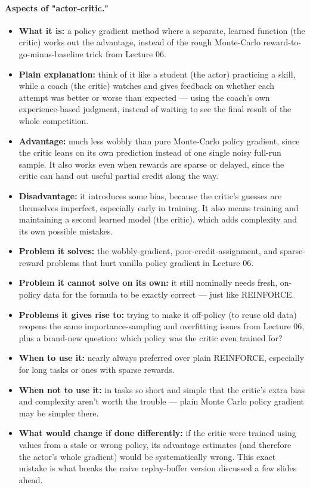 \documentclass[11pt]{article}
\begin{document}
\paragraph{Aspects of "actor-critic."}
\begin{itemize}[leftmargin=*]
  \item \textbf{What it is:} a policy gradient method where a separate, learned function (the critic) works out the advantage, instead of the rough Monte-Carlo reward-to-go-minus-baseline trick from Lecture 06.
  \item \textbf{Plain explanation:} think of it like a student (the actor) practicing a skill, while a coach (the critic) watches and gives feedback on whether each attempt was better or worse than expected --- using the coach's own experience-based judgment, instead of waiting to see the final result of the whole competition.
  \item \textbf{Advantage:} much less wobbly than pure Monte-Carlo policy gradient, since the critic leans on its own prediction instead of one single noisy full-run sample. It also works even when rewards are sparse or delayed, since the critic can hand out useful partial credit along the way.
  \item \textbf{Disadvantage:} it introduces some bias, because the critic's guesses are themselves imperfect, especially early in training. It also means training and maintaining a second learned model (the critic), which adds complexity and its own possible mistakes.
  \item \textbf{Problem it solves:} the wobbly-gradient, poor-credit-assignment, and sparse-reward problems that hurt vanilla policy gradient in Lecture 06.
  \item \textbf{Problem it cannot solve on its own:} it still nominally needs fresh, on-policy data for the formula to be exactly correct --- just like REINFORCE.
  \item \textbf{Problems it gives rise to:} trying to make it off-policy (to reuse old data) reopens the same importance-sampling and overfitting issues from Lecture 06, plus a brand-new question: which policy was the critic even trained for?
  \item \textbf{When to use it:} nearly always preferred over plain REINFORCE, especially for long tasks or ones with sparse rewards.
  \item \textbf{When not to use it:} in tasks so short and simple that the critic's extra bias and complexity aren't worth the trouble --- plain Monte Carlo policy gradient may be simpler there.
  \item \textbf{What would change if done differently:} if the critic were trained using values from a stale or wrong policy, its advantage estimates (and therefore the actor's whole gradient) would be systematically wrong. This exact mistake is what breaks the naive replay-buffer version discussed a few slides ahead.
\end{itemize}
\end{document}
